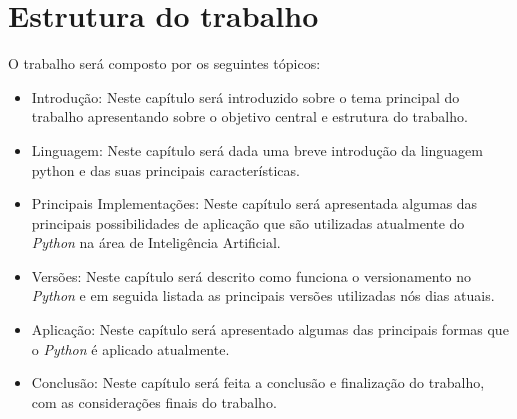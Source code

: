 \section{Estrutura do trabalho}
O trabalho será composto por os seguintes tópicos:
\begin{itemize}
   \item {Introdução}: Neste capítulo será introduzido sobre o tema principal do trabalho apresentando sobre o objetivo central e estrutura do trabalho.
   \item {Linguagem}: Neste capítulo será dada uma breve introdução da linguagem python e das suas principais características.
   \item {Principais Implementações}: Neste capítulo será apresentada algumas das principais possibilidades de aplicação que são utilizadas atualmente do \textit{Python} na área de Inteligência Artificial.
   \item {Versões}: Neste capítulo será descrito como funciona o versionamento no \textit{Python} e em seguida listada as principais versões utilizadas nós dias atuais.
   \item {Aplicação}: Neste capítulo será apresentado algumas das principais formas que o \textit{Python} é aplicado atualmente.
   \item {Conclusão}: Neste capítulo será feita a conclusão e finalização do trabalho, com as considerações finais do trabalho.
\end{itemize}
